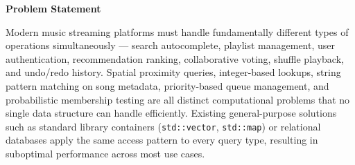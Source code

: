 \documentclass[12pt, a4paper]{article}
\begin{document}
\begin{titlepage}
\begin{center}

\thispagestyle{empty}
\setlength{\fboxrule}{2pt}

\end{center}
\end{titlepage}


\textbf{Problem Statement}

Modern music streaming platforms must handle fundamentally different types of operations simultaneously --- search autocomplete, playlist management, user authentication, recommendation ranking, collaborative voting, shuffle playback, and undo/redo history. Spatial proximity queries, integer-based lookups, string pattern matching on song metadata, priority-based queue management, and probabilistic membership testing are all distinct computational problems that no single data structure can handle efficiently. Existing general-purpose solutions such as standard library containers (\texttt{std::vector}, \texttt{std::map}) or relational databases apply the same access pattern to every query type, resulting in suboptimal performance across most use cases.
\end{document}
